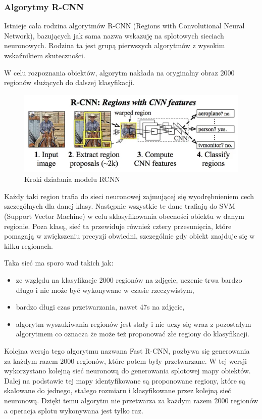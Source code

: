 \subsubsection{Algorytmy R-CNN}
Istnieje cała rodzina algorytmów R-CNN (Regions with Convolutional Neural Network), bazujących jak sama nazwa wskazuję na splotowych sieciach neuronowych.
Rodzina ta jest grupą pierwszych algorytmów z wysokim wskaźnikiem skuteczności.

W celu rozpoznania obiektów, algorytm nakłada na oryginalny obraz 2000 regionów służących do dalszej klasyfikacji.
\begin{figure}[H]
	\centering
	\includegraphics[width=12cm]{pages/teoria/zdjecia/strukturaSieciRCNN.png}
	\caption{Kroki działania modelu RCNN \cite{rcnnAndFRCNNTowards}}
\end{figure}
Każdy taki region trafia do sieci neuronowej zajmującej się wyodrębnieniem cech szczególnych dla danej klasy. 
Następnie wszystkie te dane trafiają do SVM (Support Vector Machine) w celu sklasyfikowania obecności obiektu w danym regionie. 
Poza klasą, sieć ta przewiduje również cztery przesunięcia, które pomagają w zwiększeniu precyzji obwiedni, szczególnie gdy obiekt znajduje się 
w kilku regionach. 

Taka sieć ma sporo wad takich jak: 
\begin{itemize}
	\item ze względu na klasyfikacje 2000 regionów na zdjęcie, uczenie trwa bardzo długo i nie może być wykonywane w czasie rzeczywistym, 
	\item bardzo długi czas przetwarzania, nawet 47s na zdjęcie, 
	\item algorytm wyszukiwania regionów jest stały i nie uczy się wraz z pozostałym algorytmem co oznacza że może też proponować złe regiony do klasyfikacji.
\end{itemize}

Kolejna wersja tego algorytmu nazwana Fast R-CNN, pozbywa się generowania za każdym razem 2000 regionów, które potem były przetwarzane. 
W tej wersji wykorzystano kolejną sieć neuronową do generowania splotowej mapy obiektów. 
Dalej na podstawie tej mapy identyfikowane są proponowane regiony, które są skalowane do jednego, stałego rozmiaru i klasyfikowane przez kolejną sieć neuronową.
Dzięki temu algorytm nie przetwarza za każdym razem 2000 regionów a operacja splotu wykonywana jest tylko raz. 

